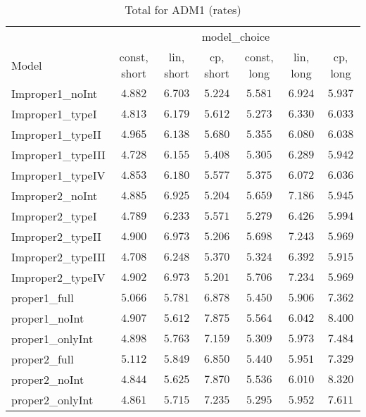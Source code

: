 \begin{table}

\caption{\label{tab:model-choice-sc18}Total for ADM1 (rates)}
\centering
\begin{tabular}{lcccccc}
\hline
 & \multicolumn{6}{c}{model_choice} \\ 
Model  & const, short & lin, short & cp, short & const, long & lin, long & \multicolumn{1}{c}{cp, long} \\ 
\hline
Improper1_noInt  & $4.882$ & $6.703$ & $5.224$ & $5.581$ & $6.924$ & $5.937$ \\
Improper1_typeI  & $4.813$ & $6.179$ & $5.612$ & $5.273$ & $6.330$ & $6.033$ \\
Improper1_typeII  & $4.965$ & $6.138$ & $5.680$ & $5.355$ & $6.080$ & $6.038$ \\
Improper1_typeIII  & $4.728$ & $6.155$ & $5.408$ & $5.305$ & $6.289$ & $5.942$ \\
Improper1_typeIV  & $4.853$ & $6.180$ & $5.577$ & $5.375$ & $6.072$ & $6.036$ \\
Improper2_noInt  & $4.885$ & $6.925$ & $5.204$ & $5.659$ & $7.186$ & $5.945$ \\
Improper2_typeI  & $4.789$ & $6.233$ & $5.571$ & $5.279$ & $6.426$ & $5.994$ \\
Improper2_typeII  & $4.900$ & $6.973$ & $5.206$ & $5.698$ & $7.243$ & $5.969$ \\
Improper2_typeIII  & $4.708$ & $6.248$ & $5.370$ & $5.324$ & $6.392$ & $5.915$ \\
Improper2_typeIV  & $4.902$ & $6.973$ & $5.201$ & $5.706$ & $7.234$ & $5.969$ \\
proper1_full  & $5.066$ & $5.781$ & $6.878$ & $5.450$ & $5.906$ & $7.362$ \\
proper1_noInt  & $4.907$ & $5.612$ & $7.875$ & $5.564$ & $6.042$ & $8.400$ \\
proper1_onlyInt  & $4.898$ & $5.763$ & $7.159$ & $5.309$ & $5.973$ & $7.484$ \\
proper2_full  & $5.112$ & $5.849$ & $6.850$ & $5.440$ & $5.951$ & $7.329$ \\
proper2_noInt  & $4.844$ & $5.625$ & $7.870$ & $5.536$ & $6.010$ & $8.320$ \\
proper2_onlyInt  & $4.861$ & $5.715$ & $7.235$ & $5.295$ & $5.952$ & $7.611$ \\
\hline 
\end{tabular}


\end{table}